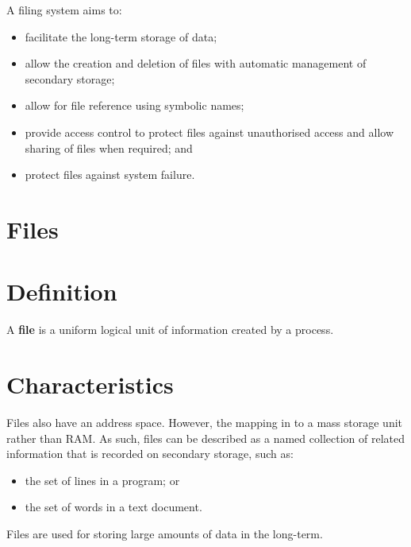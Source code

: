 \documentclass[a4paper]{systems-software}
\begin{document}
A filing system aims to:
\begin{itemize}
	\item facilitate the long-term storage of data;
	\item allow the creation and deletion of files with automatic management of secondary storage;
	\item allow for file reference using symbolic names;
	\item provide access control to protect files against unauthorised access and allow sharing of files when required; and
	\item protect files against system failure.
\end{itemize}


\section{Files}

\section*{Definition}

A \textbf{file} is a uniform logical unit of information created by a process.


\section*{Characteristics}

Files also have an address space. However, the mapping in to a mass storage unit rather than RAM. As such, files can be described as a named collection of related information that is recorded on secondary storage, such as:
\begin{itemize}
	\item the set of lines in a program; or
	\item the set of words in a text document.
\end{itemize}

Files are used for storing large amounts of data in the long-term.
\end{document}
